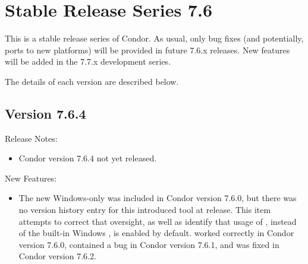 
\section{\label{sec:History-7-6}Stable Release Series 7.6}

This is a stable release series of Condor.
As usual, only bug fixes (and potentially, ports to new platforms)
will be provided in future 7.6.x releases.
New features will be added in the 7.7.x development series.

The details of each version are described below.

\subsection*{\label{sec:New-7-6-4}Version 7.6.4}

\noindent Release Notes:

\begin{itemize}

\item Condor version 7.6.4 not yet released.

\end{itemize}


\noindent New Features:

\begin{itemize}

\item The new Windows-only  was included in Condor version 7.6.0,
but there was no version history entry for this introduced tool at release.
This item attempts to correct that oversight, 
as well as identify that usage of ,
instead of the built-in Windows , 
is enabled by default.
 worked correctly in Condor version 7.6.0, 
contained a bug in Condor version 7.6.1,
and was fixed in Condor version 7.6.2.


\end{itemize}

